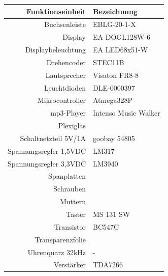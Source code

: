 \documentclass[journal, a4paper]{IEEEtran}
\begin{document}
		\begin{center}
			\begin{tabular}{rl}
				\toprule
				Funktionseinheit & Bezeichnung \\
				\midrule
				Buchsenleiste & EBLG-20-1-X\\
				Display & EA DOGL128W-6 \\
				Displaybeleuchtung & EA LED68x51-W\\
				Drehencoder & STEC11B \\
				Lautsprecher & Visaton FR8-8 \\
				Leuchtdioden & DLE-0000397\\
				Mikrocontroller & Atmega328P \\
				mp3-Player & Intenso Music Walker \\
				Plexiglas & \\
				Schaltnetzteil 5V/1A & goobay 54805 \\
				Spannungsregler 1,5VDC & LM317\\
				Spannungsregler 3,3VDC & LM3940 \\
				Spanplatten & \\
				Schrauben &\\
				Muttern&\\
				Taster & MS 131 SW \\
				Transistor & BC547C \\
				Transparenzfolie & \\
				Uhrenquarz 32kHz& - \\			
				Verstärker & TDA7266 \\
				\bottomrule		
			\end{tabular}
			\label{tab:Bauteile}
		\end{center}
		
\end{document}
